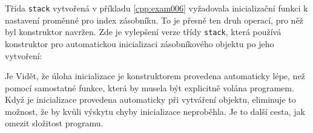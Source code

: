 \begin{mdframed}[style=mdexam]
  \begin{example}\label{cpp:exam012}
    Třída \lstinline[style=luaCPPText]!stack! vytvořená v příkladu \ref{cpp:exam006} vyžadovala
    inicializační funkci k nastavení proměnné pro index zásobníku. To je přesně ten druh
    operací, pro něž byl konstruktor navržen. Zde je vylepšení verze třídy
    \lstinline[style=luaCPPText]!stack!, která používá konstruktor pro automatickou inicializaci
    zásobníkového objektu po jeho vytvoření:
    
    Je Vidět, že úloha inicializace je konstruktorem provedena automaticky lépe, než pomocí 
    samostatné funkce, která by musela být explicitně volána programem. Když je inicializace 
    provedena automaticky při vytváření objektu, eliminuje to možnost, že by kvůli výskytu 
    chyby inicializace neproběhla. Je to další cesta, jak omezit složitost programu.
  \end{example}
\end{mdframed}